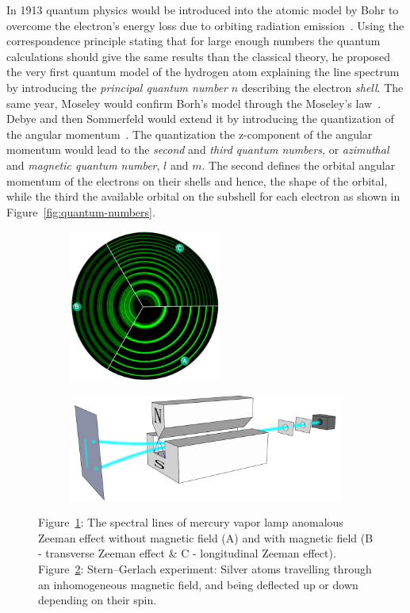	In 1913 quantum physics would be introduced into the atomic model by Bohr to overcome the electron's energy loss due to orbiting radiation emission~\cite{BOHR1913}. Using the correspondence principle stating that for large enough numbers the quantum calculations should give the same results than the classical theory, he proposed the very first quantum model of the hydrogen atom explaining the line spectrum by introducing the \textit{principal quantum number} $n$ describing the electron \textit{shell}. The same year, Moseley would confirm Borh's model through the Moseley's law~\cite{MOSELEY1913}. Debye and then Sommerfeld would extend it by introducing the quantization of the angular momentum~\cite{SOMMERFELD1916}. The quantization the z-component of the angular momentum would lead to the \textit{second} and \textit{third quantum numbers}, or \textit{azimuthal} and \textit{magnetic quantum number}, $l$ and $m$. The second defines the orbital angular momentum of the electrons on their shells and hence, the shape of the orbital, while the third the available orbital on the subshell for each electron as shown in Figure~\ref{fig:quantum-numbers}.
	
	\begin{figure}[H]
		\begin{subfigure}{\linewidth}
			\centering
			\includegraphics[height=5cm]{fig/chapt2/ZeemanEffectIllus.png}
			\caption{\label{fig:spin:A}}
		\end{subfigure}
		\begin{subfigure}{\linewidth}
			\centering
			\includegraphics[width = \plotwidth]{fig/chapt2/Stern-Gerlach_experiment.pdf}
			\caption{\label{fig:spin:B}}
		\end{subfigure}
		\caption{\label{fig:spin} Figure~\ref{fig:spin:A}: The spectral lines of mercury vapor lamp anomalous Zeeman effect without magnetic field (A) and with magnetic field (B - transverse Zeeman effect \& C - longitudinal Zeeman effect). Figure~\ref{fig:spin:B}: Stern–Gerlach experiment: Silver atoms travelling through an inhomogeneous magnetic field, and being deflected up or down depending on their spin.}
	\end{figure}
	

